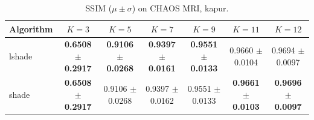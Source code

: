 \begin{table}[htbp]
\centering
\caption{SSIM ($\mu \pm \sigma$) on CHAOS MRI, kapur.}
\label{tab:exp2-kapur-ssim}
\begin{tabular}{lcccccc}
\toprule
Algorithm & $K=3$ & $K=5$ & $K=7$ & $K=9$ & $K=11$ & $K=12$ \\
\midrule
lshade & \textbf{0.6508 $\pm$ 0.2917} & \textbf{0.9106 $\pm$ 0.0268} & \textbf{0.9397 $\pm$ 0.0161} & \textbf{0.9551 $\pm$ 0.0133} & 0.9660 $\pm$ 0.0104 & 0.9694 $\pm$ 0.0097 \\
shade & \textbf{0.6508 $\pm$ 0.2917} & 0.9106 $\pm$ 0.0268 & 0.9397 $\pm$ 0.0162 & 0.9551 $\pm$ 0.0133 & \textbf{0.9661 $\pm$ 0.0103} & \textbf{0.9696 $\pm$ 0.0097} \\
\bottomrule
\end{tabular}
\end{table}